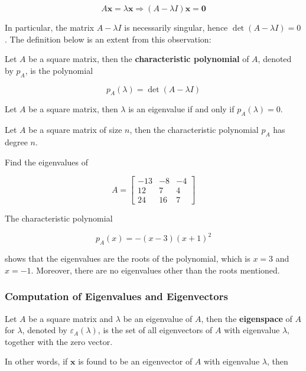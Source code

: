 \documentclass[a4paper,12pt]{article}
\begin{document}
$$A\mathbf{x}=\lambda\mathbf{x}\Rightarrow(A-\lambda I)\mathbf{x}=\mathbf{0}$$\s

In particular, the matrix $A-\lambda I$ is necessarily singular, hence $\det(A-\lambda I)=0$. The definition below is an extent from this observation:

\begin{dft}
  Let $A$ be a square matrix, then the \textbf{characteristic polynomial} of $A$, denoted by $p_{A}$, is the polynomial

  $$p_{A}(\lambda)=\det(A-\lambda I)$$
\end{dft}\n

\begin{thm}
  Let $A$ be a square matrix, then $\lambda$ is an eigenvalue if and only if $p_{A}(\lambda)=0$.
\end{thm}\n

\begin{thm}
  Let $A$ be a square matrix of size $n$, then the characteristic polynomial $p_{A}$ has degree $n$.
\end{thm}\n

\begin{exm}
  Find the eigenvalues of

  $$A=\begin{bmatrix}
    -13 & -8 & -4\\
    12 & 7 & 4\\
    24 & 16 & 7
  \end{bmatrix}$$\s

  \ans The characteristic polynomial

  $$p_{A}(x)=-(x-3)(x+1)^{2}$$\s

  shows that the eigenvalues are the roots of the polynomial, which is $x=3$ and $x=-1$. Moreover, there are no eigenvalues other than the roots mentioned.
\end{exm}\n

\subsubsection{Computation of Eigenvalues and Eigenvectors}
\begin{dft}
  Let $A$ be a square matrix and $\lambda$ be an eigenvalue of $A$, then the \textbf{eigenspace} of $A$ for $\lambda$, denoted by $\varepsilon_{A}(\lambda)$, is the set of all eigenvectors of $A$ with eigenvalue $\lambda$, together with the zero vector.
\end{dft}\n

In other words, if $\mathbf{x}$ is found to be an eigenvector of $A$ with eigenvalue $\lambda$, then
\end{document}

